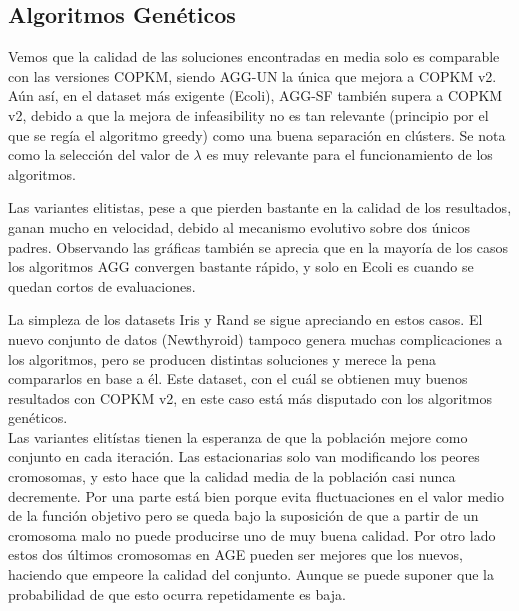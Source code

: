 
\subsection{Algoritmos Genéticos}

Vemos que la calidad de las soluciones encontradas en media solo es comparable con las versiones COPKM, siendo AGG-UN la única que mejora a COPKM v2. Aún así, en el dataset más exigente (Ecoli), AGG-SF también supera a COPKM v2, debido a que la mejora de infeasibility no es tan relevante (principio por el que se regía el algoritmo greedy) como una buena separación en clústers. Se nota como la selección del valor de $\lambda$ es muy relevante para el funcionamiento de los algoritmos.

Las variantes elitistas, pese a que pierden bastante en la calidad de los resultados, ganan mucho en velocidad, debido al mecanismo evolutivo sobre dos únicos padres.
Observando las gráficas también se aprecia que en la mayoría de los casos los algoritmos AGG convergen bastante rápido, y solo en Ecoli es cuando se quedan cortos de evaluaciones.

La simpleza de los datasets Iris y Rand se sigue apreciando en estos casos. El nuevo conjunto de datos (Newthyroid) tampoco genera muchas complicaciones a los algoritmos, pero se producen distintas soluciones y merece la pena compararlos en base a él. Este dataset, con el cuál se obtienen muy buenos resultados con COPKM v2, en este caso está más disputado con los algoritmos genéticos. \\

Las variantes elitístas tienen la esperanza de que la población mejore como conjunto en cada iteración. Las estacionarias solo van modificando los peores cromosomas, y esto hace que la calidad media de la población casi nunca decremente. Por una parte está bien porque evita fluctuaciones en el valor medio de la función objetivo pero se queda bajo la suposición de que a partir de un cromosoma malo no puede producirse uno de muy buena calidad.
Por otro lado estos dos últimos cromosomas en AGE pueden ser mejores que los nuevos, haciendo que empeore la calidad del conjunto. Aunque se puede suponer que la probabilidad de que esto ocurra repetidamente es baja.

